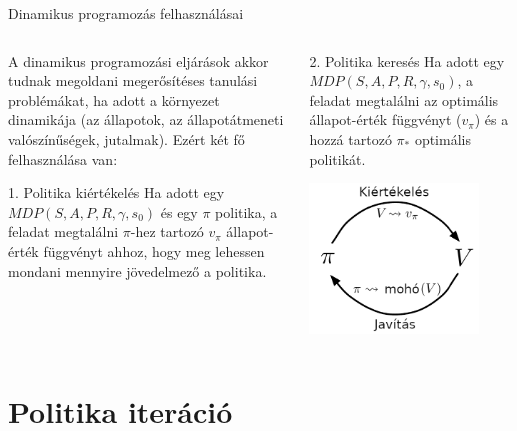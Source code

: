 \documentclass[english, aspectratio=169]{beamer}
\makeatletter
\let\origtableofcontents=\tableofcontents
\def\tableofcontents{\@ifnextchar[{\origtableofcontents}{\gobbletableofcontents}}
\def\gobbletableofcontents#1{\origtableofcontents}
\makeatother
\begin{document}
\begin{frame}{Dinamikus programozás felhasználásai}
\begin{columns}
\begin{column}{.5\textwidth}
A dinamikus programozási eljárások akkor tudnak megoldani megerősítéses tanulási problémákat, ha adott a környezet dinamikája (az állapotok, az állapotátmeneti valószínűségek, jutalmak). Ezért két fő felhasználása van:\\
\begin{block}{1. Politika kiértékelés}
Ha adott egy $MDP(S,A,P,R,\gamma,s_{0})$ és egy $\pi$ politika, a feladat megtalálni $\pi$-hez tartozó $v_{\pi}$ állapot-érték függvényt ahhoz, hogy meg lehessen mondani mennyire jövedelmező a politika. 
\end{block}
\end{column}
\begin{column}{.5\textwidth}
\begin{block}{2. Politika keresés}
Ha adott egy $MDP(S,A,P,R,\gamma,s_{0})$, a feladat megtalálni az optimális állapot-érték függvényt ($v_{\pi}$) és a hozzá tartozó $\pi_{*}$ optimális politikát. 
\end{block}
\begin{center}
\includegraphics[width=4.5cm, keepaspectratio]{images/solving_9.png}
\end{center}
\end{column}
\end{columns}
\end{frame}

\section{Politika iteráció}

\begin{frame}
\tableofcontents[currentsection]
\end{frame}
\end{document}
